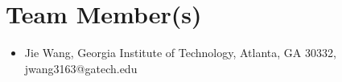 \documentclass[competition,nonblindrev, 12pt]{informs3-competition}
\theoremstyle{TH}%
\theoremstyle{TH}%
\begin{document}
\vspace{-1em}
\section{Team Member(s)}


\begin{itemize}
\item Jie Wang, Georgia Institute of Technology, Atlanta, GA 30332, jwang3163@gatech.edu
\end{itemize}








\end{document}
